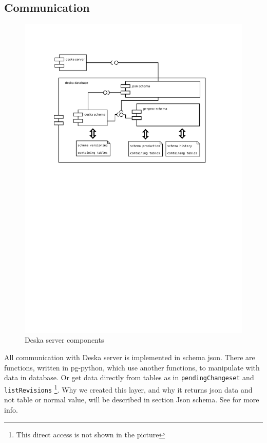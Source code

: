 \documentclass[deska]{subfiles}
\begin{document}
\subsection{Communication}
\begin{figure}[h]
	\centering
	\label{img:deska-server}
	\includegraphics[trim=28mm 170mm 30mm 28mm]{img-deska-server-components.pdf}
	\caption{Deska server components}
\end{figure}

All communication with Deska server is implemented in schema json. There are functions, written in pg-python, which use another
functions, to manipulate with data in database. Or get data directly from tables as in {\tt pendingChangeset} and {\tt listRevisions}
\footnote{This direct access is not shown in the picture}.
Why we created this layer, and why it returns json data and not table or normal value, will be described in section Json schema.
See  for more info.
\end{document}
